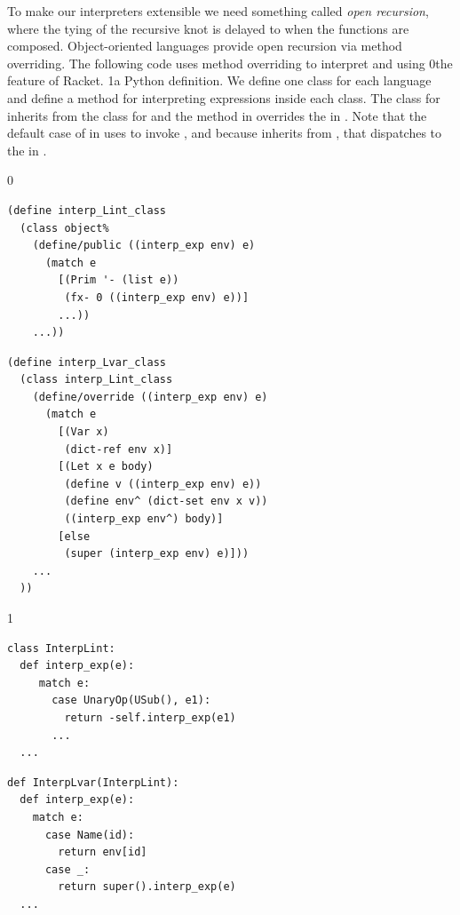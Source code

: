 \documentclass[7x10,nocrop]{TimesAPriori_MIT}%
\def\racketEd{0}
\def\pythonEd{1}
\def\edition{0}
\newcommand{\racket}[1]{{\if\edition\racketEd{#1}\fi}}
\newcommand{\python}[1]{{\if\edition\pythonEd #1\fi}}
\begin{document}
To make our interpreters extensible we need something called
\emph{open recursion}, where the tying of the
recursive knot is delayed to when the functions are
composed. Object-oriented languages provide open recursion via
method overriding. The
following code uses method overriding to interpret \LangInt{} and
\LangVar{} using
%
\racket{the
  \href{https://docs.racket-lang.org/guide/classes.html}{\code{class}}
  \index{subject}{class} feature of Racket.}
%
\python{a Python  definition.}
%
We define one class for each language and define a method for
interpreting expressions inside each class. The class for \LangVar{}
inherits from the class for \LangInt{} and the method
 in \LangVar{} overrides the  in
\LangInt{}. Note that the default case of  in
\LangVar{} uses  to invoke , and because
\LangVar{} inherits from \LangInt{}, that dispatches to the
 in \LangInt{}.
\begin{center}
  \hspace{-20pt}
{\if\edition\racketEd  
\begin{minipage}{0.45\textwidth}
\begin{lstlisting}
(define interp_Lint_class
  (class object%
    (define/public ((interp_exp env) e)
      (match e
        [(Prim '- (list e))
         (fx- 0 ((interp_exp env) e))]
        ...))
    ...))
\end{lstlisting}
\end{minipage}
\begin{minipage}{0.45\textwidth}
  \begin{lstlisting}
(define interp_Lvar_class
  (class interp_Lint_class
    (define/override ((interp_exp env) e)
      (match e
        [(Var x)
         (dict-ref env x)]
        [(Let x e body)
         (define v ((interp_exp env) e))
         (define env^ (dict-set env x v))
         ((interp_exp env^) body)]
        [else
         (super (interp_exp env) e)]))
    ...
  ))
\end{lstlisting}
\end{minipage}
\fi}
{\if\edition\pythonEd
\begin{minipage}{0.45\textwidth}
\begin{lstlisting}
class InterpLint:
  def interp_exp(e):
     match e:
       case UnaryOp(USub(), e1):
         return -self.interp_exp(e1)
       ...
  ...
\end{lstlisting}
\end{minipage}
\begin{minipage}{0.45\textwidth}
  \begin{lstlisting}
def InterpLvar(InterpLint):
  def interp_exp(e):
    match e:
      case Name(id):
        return env[id]
      case _:
        return super().interp_exp(e)
  ...
\end{lstlisting}
\end{minipage}
\fi}
\end{center}
\end{document}
